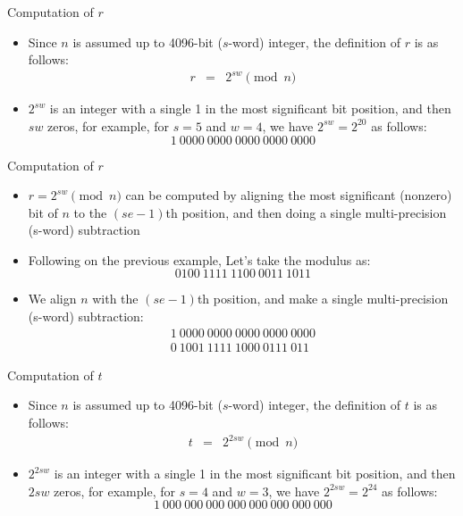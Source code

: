 \documentclass[xcolor=dvipsnames]{beamer}
\begin{document}
\begin{frame}{Computation of $r$}
\begin{itemize}

\item Since $n$ is assumed up to 4096-bit ($s$-word) integer, the definition
of $r$ is as follows:
\begin{eqnarray*}
r   & = & 2^{sw} \pmod{n}
\end{eqnarray*}

\item $2^{sw}$ is an integer with a single 1 in the most significant bit
position, and then $sw$ zeros, for example, for $s=5$ and $w=4$,
we have $2^{sw}=2^{20}$ as follows:
\[
1~0000~0000~0000~0000~0000
\]


\end{itemize}
\end{frame}

\begin{frame}{Computation of $r$}
\begin{itemize}

\item $r=2^{sw} \pmod{n}$ can be computed by aligning the most significant 
(nonzero) bit of $n$ to the $(se-1)$th position, and then doing a single 
multi-precision (s-word) subtraction

\item Following on the previous example, Let's take the modulus as:
\[
0100~1111~1100~0011~1011
\]
\item We align $n$ with the $(se-1)$th position, and make a single 
multi-precision (s-word) subtraction:
\[
\begin{array}{l}
1~0000~0000~0000~0000~0000 \\
0~1001~1111~1000~0111~011
\end{array}
\]

\end{itemize}
\end{frame}

\begin{frame}{Computation of $t$}
\begin{itemize}

\item Since $n$ is assumed up to 4096-bit ($s$-word) integer, the definition
of $t$ is as follows:
\begin{eqnarray*}
t   & = & 2^{2sw} \pmod{n}
\end{eqnarray*}

\item $2^{2sw}$ is an integer with a single 1 in the most significant bit
position, and then $2sw$ zeros, for example, for $s=4$ and $w=3$,
we have $2^{2sw}=2^{24}$ as follows:
\[
1~000~000~000~000~000~000~000~000
\]

\end{itemize}
\end{frame}
\end{document}

